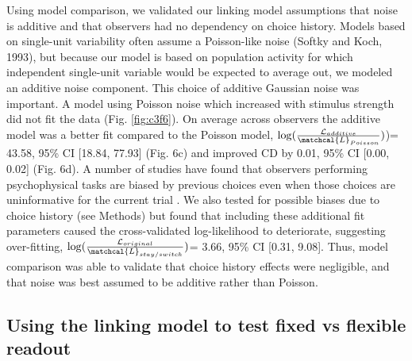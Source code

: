 Using model comparison, we validated our linking model assumptions that noise is additive and that observers had no dependency on choice history. Models based on single-unit variability often assume a Poisson-like noise (Softky and Koch, 1993), but because our model is based on population activity for which independent single-unit variable would be expected to average out, we modeled an additive noise component. This choice of additive Gaussian noise was important. A model using Poisson noise which increased with stimulus strength did not fit the data (Fig. \ref{fig:c3f6}). On average across observers the additive model was a better fit compared to the Poisson model, $\log(\frac{\mathcal{L}_{additive}}{\matchcal{L}_{Poisson}})$)= 43.58, 95\% CI [18.84, 77.93] (Fig. 6c) and improved CD by 0.01, 95\% CI [0.00, 0.02] (Fig. 6d). A number of studies have found that observers performing psychophysical tasks are biased by previous choices even when those choices are uninformative for the current trial \citep{Abrahamyan2016-od,Frund2014-kh}. We also tested for possible biases due to choice history (see Methods) but found that including these additional fit parameters caused the cross-validated log-likelihood to deteriorate, suggesting over-fitting, $\log(\frac{\mathcal{L}_{original}}{\matchcal{L}_{stay/switch}})$= 3.66, 95\% CI [0.31, 9.08]. Thus, model comparison was able to validate that choice history effects were negligible, and that noise was best assumed to be additive rather than Poisson.

\subsection{Using the linking model to test fixed vs flexible readout}

